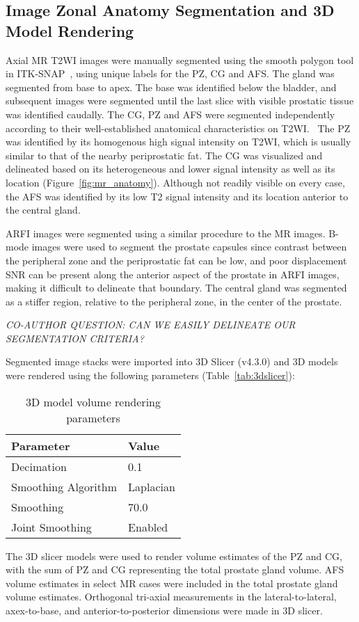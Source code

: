 \subsection{Image Zonal Anatomy Segmentation and 3D Model Rendering}
Axial MR T2WI images were manually segmented using the smooth polygon tool in
ITK-SNAP~\cite{Yushkevich2006}, using unique labels for the PZ, CG and AFS. The
gland was segmented from base to apex.  The base was identified below the
bladder, and subsequent images were segmented until the last slice with visible
prostatic tissue was identified caudally. The CG, PZ and AFS were segmented
independently according to their well-established anatomical characteristics on
T2WI.~\cite{Verma2011,Jung2012,Poon1985,Hricak2007,Bonekamp2011} The PZ was
identified by its homogenous high signal intensity on T2WI, which is usually
similar to that of the nearby periprostatic fat. The CG was visualized and
delineated based on its heterogeneous and lower signal intensity as well as its
location (Figure~\ref{fig:mr_anatomy}). Although not readily visible on every
case, the AFS was identified by its low T2 signal intensity and its location
anterior to the central gland. 

ARFI images were segmented using a similar procedure to the MR images.  B-mode
images were used to segment the prostate capsules since contrast between the
peripheral zone and the periprostatic fat can be low, and poor displacement SNR
can be present along the anterior aspect of the prostate in ARFI images, making
it difficult to delineate that boundary.  The central gland was segmented as a
stiffer region, relative to the peripheral zone, in the center of the prostate.

\emph{CO-AUTHOR QUESTION: CAN WE EASILY DELINEATE OUR SEGMENTATION CRITERIA?}

Segmented image stacks were imported into 3D Slicer (v4.3.0) and 3D
models were rendered using the following parameters (Table~\ref{tab:3dslicer}):

\begin{table}[h!]
\centering
\caption{3D model volume rendering parameters}
\begin{tabular}{ll}
{\bf Parameter} & {\bf Value} \\ \hline
Decimation & 0.1 \\
Smoothing Algorithm & Laplacian \\
Smoothing  & 70.0 \\
Joint Smoothing & Enabled \\
\end{tabular}
\end{table}

The 3D slicer models were used to render volume estimates of the PZ and CG,
with the sum of PZ and CG representing the total prostate gland volume.  AFS
volume estimates in select MR cases were included in the total prostate gland
volume estimates.  Orthogonal tri-axial measurements in the lateral-to-lateral,
axex-to-base, and anterior-to-posterior dimensions were made in 3D slicer.
